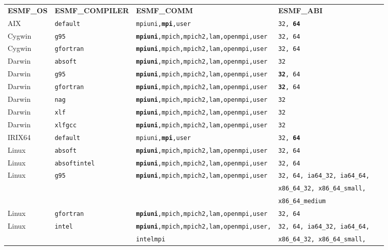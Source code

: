 \begin{tabular}{lllll}
  {\bfseries\footnotesize ESMF\_OS} &{\bfseries\footnotesize ESMF\_COMPILER} & {\bfseries\footnotesize ESMF\_COMM} & {\bfseries\footnotesize ESMF\_ABI} \\

AIX     &\tt default     &\tt mpiuni,{\bf mpi},user      &\tt 32, {\bf 64} \\
Cygwin  &\tt g95         &\tt {\bf mpiuni},mpich,mpich2,lam,openmpi,user &\tt 32, 64 \\
Cygwin  &\tt gfortran    &\tt {\bf mpiuni},mpich,mpich2,lam,openmpi,user &\tt 32, 64 \\
Darwin  &\tt absoft      &\tt {\bf mpiuni},mpich,mpich2,lam,openmpi,user &\tt 32 \\
Darwin  &\tt g95         &\tt {\bf mpiuni},mpich,mpich2,lam,openmpi,user &\tt {\bf 32}, 64 \\
Darwin  &\tt gfortran    &\tt {\bf mpiuni},mpich,mpich2,lam,openmpi,user &\tt {\bf 32}, 64 \\
Darwin  &\tt nag         &\tt {\bf mpiuni},mpich,mpich2,lam,openmpi,user &\tt 32 \\
Darwin  &\tt xlf         &\tt {\bf mpiuni},mpich,mpich2,lam,openmpi,user &\tt 32 \\
Darwin  &\tt xlfgcc      &\tt {\bf mpiuni},mpich,mpich2,lam,openmpi,user &\tt 32 \\
IRIX64  &\tt default     &\tt mpiuni,{\bf mpi},user     &\tt 32, {\bf 64} \\
Linux   &\tt absoft      &\tt {\bf mpiuni},mpich,mpich2,lam,openmpi,user &\tt 32, 64 \\
Linux   &\tt absoftintel &\tt {\bf mpiuni},mpich,mpich2,lam,openmpi,user &\tt 32, 64  \\
Linux   &\tt g95         &\tt {\bf mpiuni},mpich,mpich2,lam,openmpi,user &\tt 32, 64, ia64\_32, ia64\_64, \\
        &                &                              &\tt x86\_64\_32, x86\_64\_small, \\
        &                &                              &\tt x86\_64\_medium \\
Linux   &\tt gfortran    &\tt {\bf mpiuni},mpich,mpich2,lam,openmpi,user &\tt 32, 64 \\
Linux   &\tt intel       &\tt {\bf mpiuni},mpich,mpich2,lam,openmpi,user,&\tt 32, 64, ia64\_32, ia64\_64, \\
        &                &\tt intelmpi                  &\tt x86\_64\_32, x86\_64\_small, \\

\end{tabular}
